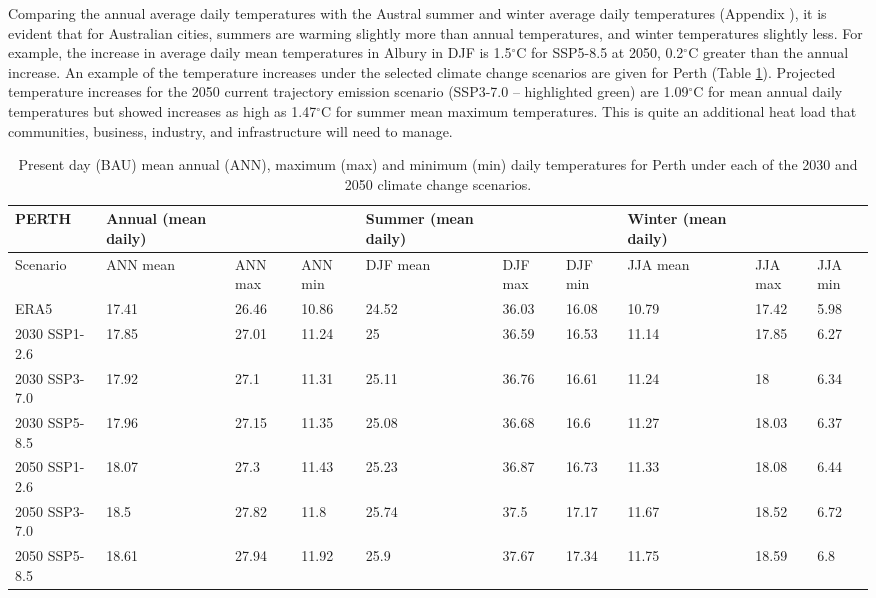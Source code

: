 \documentclass[final,3p,times,authoryear]{elsarticle}
\begin{document}
Comparing the annual average daily temperatures with the Austral summer and winter average daily temperatures (Appendix \label{section:appendix2}), it is evident that for Australian cities, summers are warming slightly more than annual temperatures, and winter temperatures slightly less.  For example, the increase in average daily mean temperatures in Albury in DJF is 1.5$^{\circ}$C for SSP5-8.5 at 2050, 0.2$^{\circ}$C greater than the annual increase. An example of the temperature increases under the selected climate change scenarios are given for Perth (Table \ref{table:perth}). Projected temperature increases for the 2050 current trajectory emission scenario (SSP3-7.0 – highlighted green) are 1.09$^{\circ}$C for mean annual daily temperatures but showed increases as high as 1.47$^{\circ}$C for summer mean maximum temperatures. This is quite an additional heat load that communities, business, industry, and infrastructure will need to manage.

\setlength\arrayrulewidth{1pt} %
\begin{table}[!ht]\caption{Present day (BAU) mean annual (ANN), maximum (max) and minimum (min) daily temperatures for Perth under each of the 2030 and 2050 climate change scenarios.}
    \centering
    \begin{tabular}{|l|p{1.5cm}|p{1.1cm}|p{1.1cm}|p{1.5cm}|p{1.1cm}|p{1.1cm}|p{1.5cm}|p{1.1cm}|p{1.1cm}|}
    \hline
        PERTH & Annual (mean daily) \cellcolor{light-gray}& ~ \cellcolor{light-gray}& ~\cellcolor{light-gray}& Summer (mean daily)\cellcolor{yellow!25}& ~\cellcolor{yellow!25} & ~\cellcolor{yellow!25} & Winter (mean daily)  \cellcolor{light-blue!25} & ~ \cellcolor{light-blue!25}& ~ \cellcolor{light-blue!25}\\ \hline
        Scenario & ANN mean \cellcolor{light-gray}& ANN max \cellcolor{light-gray}& ANN min\cellcolor{light-gray} & DJF mean\cellcolor{yellow!25} & DJF max\cellcolor{yellow!25} & DJF min\cellcolor{yellow!25} & JJA mean \cellcolor{light-blue!25}& JJA max \cellcolor{light-blue!25}& JJA min \cellcolor{light-blue!25}\\ \hline
        ERA5 & 17.41 & 26.46 & 10.86 & 24.52 & 36.03 & 16.08 & 10.79 & 17.42 & 5.98 \\ \hline
        2030 SSP1-2.6 & 17.85 & 27.01 & 11.24 & 25 & 36.59 & 16.53 & 11.14 & 17.85 & 6.27 \\ \hline
        2030 SSP3-7.0 & 17.92 & 27.1 & 11.31 & 25.11 & 36.76 & 16.61 & 11.24 & 18 & 6.34 \\ \hline
        2030 SSP5-8.5 & 17.96 & 27.15 & 11.35 & 25.08 & 36.68 & 16.6 & 11.27 & 18.03 & 6.37 \\ \hline
        2050 SSP1-2.6 & 18.07 & 27.3 & 11.43 & 25.23 & 36.87 & 16.73 & 11.33 & 18.08 & 6.44 \\ \hline
        \rowcolor{light-green!25}2050 SSP3-7.0 & 18.5 & 27.82 & 11.8 & 25.74 & 37.5 & 17.17 & 11.67 & 18.52 & 6.72 \\ \hline
        2050 SSP5-8.5 & 18.61 & 27.94 & 11.92 & 25.9 & 37.67 & 17.34 & 11.75 & 18.59 & 6.8 \\ \hline
    \end{tabular}\label{table:perth}
\end{table}
\setlength\arrayrulewidth{0.4pt} %
\end{document}
